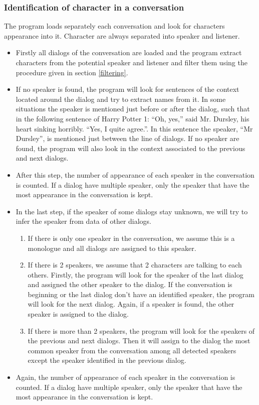 \documentclass[a4paper, 12pt]{report}
\begin{document}
\subsubsection{Identification of character in a conversation}
The program loads separately each conversation and look for characters appearance into it. Character are always separated into speaker and listener. \\
\begin{itemize}
\item Firstly all dialogs of the conversation are loaded and the program extract characters from the potential speaker and listener and filter them using the procedure given in section \ref{filtering}. 

\item If no speaker is found, the program will look for sentences of the context located around the dialog and try to extract names from it. In some situations the speaker is mentioned just before or after the dialog, such that in the following sentence of Harry Potter 1: “Oh, yes,” said Mr. Dursley, his heart sinking horribly. “Yes, I quite agree.”. In this sentence the speaker, ``Mr Dursley'', is mentioned just between the line of dialogs. If no speaker are found, the program will also look in the context associated to the previous and next dialogs.\\

\item After this step, the number of appearance of each speaker in the conversation is counted. If a dialog have multiple speaker, only the speaker that have the most appearance in the conversation is kept.

\item In the last step, if the speaker of some dialogs stay unknown, we will try to infer the speaker from data of other dialogs.
	\begin{enumerate}
	\item If there is only one speaker in the conversation, we assume this is a monologue and all dialogs are assigned to this speaker.
	\item If there is 2 speakers, we assume that 2 characters are talking to each others. Firstly, the program will look for the speaker of the last dialog and assigned the other speaker to the dialog. If the conversation is beginning or the last dialog don't have an identified speaker, the program will look for the next dialog. Again, if a speaker is found, the other speaker is assigned to the dialog.
	\item If there is more than 2 speakers, the program will look for the speakers of the previous and next dialogs. Then it will assign to the dialog the most common speaker from the conversation among all detected speakers except the speaker identified in the previous dialog.
	\end{enumerate}
\item Again, the number of appearance of each speaker in the conversation is counted. If a dialog have multiple speaker, only the speaker that have the most appearance in the conversation is kept.


\end{itemize}
\end{document}
